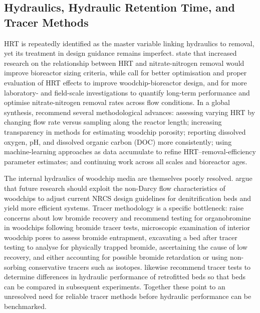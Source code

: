 \documentclass[11pt]{article}
\begin{document}
\subsection{Hydraulics, Hydraulic Retention Time, and Tracer Methods}
HRT is repeatedly identified as the master variable linking hydraulics to removal, yet its treatment in design guidance remains imperfect. \textcite{Moorman2015} state that increased research on the relationship between HRT and nitrate-nitrogen removal would improve bioreactor sizing criteria, while \textcite{Povilaitis2018} call for better optimisation and proper evaluation of HRT effects to improve woodchip-bioreactor design, and for more laboratory- and field-scale investigations to quantify long-term performance and optimise nitrate-nitrogen removal rates across flow conditions. In a global synthesis, \textcite{Christianson2025c} recommend several methodological advances: assessing varying HRT by changing flow rate versus sampling along the reactor length; increasing transparency in methods for estimating woodchip porosity; reporting dissolved oxygen, pH, and dissolved organic carbon (DOC) more consistently; using machine-learning approaches as data accumulate to refine HRT--removal-efficiency parameter estimates; and continuing work across all scales and bioreactor ages.

The internal hydraulics of woodchip media are themselves poorly resolved. \textcite{Ghane2016} argue that future research should exploit the non-Darcy flow characteristics of woodchips to adjust current NRCS design guidelines for denitrification beds and yield more efficient systems. Tracer methodology is a specific bottleneck: \textcite{Ghane2019b} raise concerns about low bromide recovery and recommend testing for organobromine in woodchips following bromide tracer tests, microscopic examination of interior woodchip pores to assess bromide entrapment, excavating a bed after tracer testing to analyse for physically trapped bromide, ascertaining the cause of low recovery, and either accounting for possible bromide retardation or using non-sorbing conservative tracers such as isotopes. \textcite{Ghane2018} likewise recommend tracer tests to determine differences in hydraulic performance of retrofitted beds so that beds can be compared in subsequent experiments. Together these point to an unresolved need for reliable tracer methods before hydraulic performance can be benchmarked.
\end{document}
